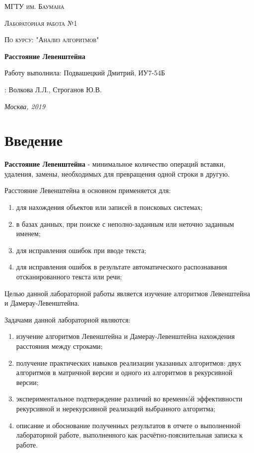 \documentclass[12pt]{report}
\begin{document}
\begin{titlepage}
	\centering
	{\scshape\LARGE МГТУ им. Баумана \par}
	\vspace{3cm}
	{\scshape\Large Лабораторная работа №1\par}
	\vspace{0.5cm}	
	{\scshape\Large По курсу: "Анализ алгоритмов"\par}
	\vspace{1.5cm}
	{\huge\bfseries Расстояние Левенштейна\par}
	\vspace{2cm}
	\Large Работу выполнила: Подвашецкий Дмитрий, ИУ7-54Б\par
	\vspace{0.5cm}
	:  Волкова Л.Л., Строганов Ю.В.\par

	\vfill
	\large \textit {Москва, 2019} \par
\end{titlepage}

\tableofcontents

\newpage
\chapter*{Введение}
\textbf{Расстояние Левенштейна} - минимальное количество операций вставки, удаления, замены, необходимых для превращения одной строки в другую.

Расстояние Левенштейна в основном применяется для:

\begin{enumerate}
	\item для нахождения объектов или записей в поисковых системах;
	\item в базах данных, при поиске с неполно-заданным или неточно заданным именем;
	\item для исправления ошибок при вводе текста;
	\item для исправления ошибок в результате автоматического распознавания отсканированного текста или речи;
\end{enumerate}

Целью данной лабораторной работы является изучение алгоритмов Левенштейна и Дамерау-Левенштейна. 

Задачами данной лабораторной являются:
\begin{enumerate}
  	\item изучение алгоритмов Левенштейна и Дамерау-Левенштейна нахождения расстояния между строками;
	\item получение практических навыков реализации указанных алгоритмов: двух алгоритмов в матричной версии и одного из алгоритмов в рекурсивной версии; 
	\item экспериментальное подтверждение различий во временнóй эффективности рекурсивной и
нерекурсивной реализаций выбранного алгоритма; 
	\item описание и обоснование полученных результатов в отчете о выполненной лабораторной
работе, выполненного как расчётно-пояснительная записка к работе. 
\end{enumerate}
\end{document}
